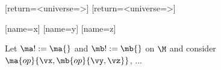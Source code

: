 \documentclass{stex}
\begin{document}

[return={\monoid<universe=\M>}]{}
[return={\monoid<universe=\M>}]{}

[name=x]{}
[name=y]{}
[name=z]{}

Let $\ma!:=\ma{}$ and $\mb!:=\mb{}$  on
$\M$ and consider $\ma{op}{\vx,\mb{op}{\vy,\vz}}$, ...
\end{document}
